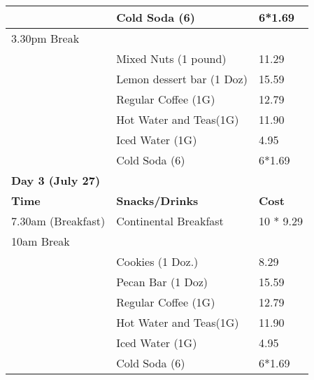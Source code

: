 \documentclass[11pt]{article}
\begin{document}
\begin{table}[htp]
{\begin{tabular}{lll}
		&	   Cold Soda  (6) & 6*1.69	 \\ \hline
3.30pm Break &  & \\
		&	    Mixed Nuts (1 pound) &   11.29  \\	
	    &		Lemon dessert bar (1 Doz)  & 15.59 \\
		& 	    Regular Coffee (1G) & 12.79 \\
		& 	    Hot Water and Teas(1G) & 11.90  \\
        &       Iced Water (1G)& 4.95 \\
		& 	    Cold Soda  (6) & 6*1.69	 \\ \hline
\multicolumn{3}{l}{\textbf{Day 3 (July 27)}}\\ \hline
\textbf{Time}  &  \textbf{Snacks/Drinks} & \textbf{Cost} \\ \hline
7.30am (Breakfast)  &    Continental Breakfast  & 10 * 9.29  \\ \hline
10am Break   &    & \\
        &      Cookies (1 Doz.) &  8.29 \\
        &      Pecan Bar (1 Doz)  &  15.59 \\
		&	   Regular Coffee (1G) & 12.79 \\
		&	   Hot Water and Teas(1G) & 11.90 \\ 
        &      Iced Water (1G)& 4.95 \\
		&	   Cold Soda  (6) & 6*1.69	 \\\hline
\end{tabular}
}
\end{table}
\end{document}
